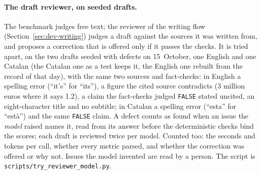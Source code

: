 \paragraph{The draft reviewer, on seeded drafts.} The benchmark judges
free text; the reviewer of the writing flow
(Section~\ref{sec:dev-writing}) judges a draft against the sources it
was written from, and proposes a correction that is offered only if it
passes the checks. It is tried apart, on the two drafts seeded with
defects on 15~October, one English and one Catalan (the Catalan one as
a test keeps it, the English one rebuilt from the record of that day),
with the same two sources and fact-checks: in English a spelling error (``it's'' for
``its''), a figure the cited source contradicts (3 million euros where
it says 1.2), a claim the fact-checks judged \texttt{FALSE} stated
uncited, an eight-character title and no subtitle; in Catalan a spelling
error (``esta'' for ``està'') and the same \texttt{FALSE} claim. A
defect counts as found when an issue the \emph{model} raised names it,
read from its answer before the deterministic checks bind the scores;
each draft is reviewed twice per model. Counted too: the seconds and
tokens per call, whether every metric parsed, and whether the correction
was offered or why not. Issues the model invented are read by a person.
The script is \texttt{scripts/try\_reviewer\_model.py}.
